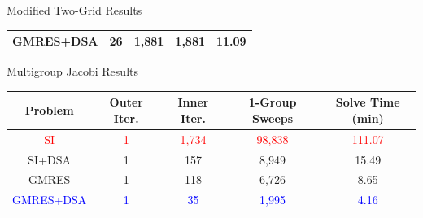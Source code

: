 \documentclass[compress,10pt]{beamer}
\newcommand{\tcr}[1]{\textcolor{red}{#1}}
\newcommand{\tcb}[1]{\textcolor{blue}{#1}}
\begin{document}
\begin{frame}[t]
{{\begin{block}{Modified Two-Grid Results}
\begin{table}
\begin{tabular}{|c|c|c|c|c|}
GMRES+DSA & 26 & 1,881 & 1,881 & 11.09  \\ \hline
\end{tabular}
\end{table}
\end{block}
\vspace{-3mm}
\begin{block}{Multigroup Jacobi Results}
\begin{table}
\begin{tabular}{|c|c|c|c|c|}
\hline
Problem & Outer Iter. & Inner Iter. & 1-Group Sweeps & Solve Time (min)  \\
\hline \hline
\tcr{SI} & \tcr{1} & \tcr{1,734} & \tcr{98,838} &  \tcr{111.07} \\ \hline
SI+DSA & 1 & 157 & 8,949 &  15.49 \\ \hline
GMRES & 1 & 118 & 6,726 &  8.65 \\ \hline
\tcb{GMRES+DSA} &  \tcb{1}& \tcb{35} & \tcb{1,995} &  \tcb{4.16} \\ \hline
\end{tabular}
\end{table}
\end{block}
}
}
\end{frame}
\end{document}
